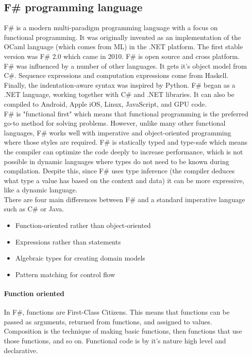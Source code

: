 \documentclass[12pt, a4paper]{article}
\begin{document}
\subsection{F\# programming language}
F\# is a modern multi-paradigm programming language with a focus on functional programming. It was originally invented as an implementation of the OCaml language (which comes from ML) in the .NET platform. The first stable version was F\# 2.0 which came in 2010. F\# is open source and cross platform. F\# was influenced by a number of other languages. It gets it’s object model from C\#. Sequence expressions and computation expressions come from Haskell. Finally, the indentation-aware syntax was inspired by Python. F\# began as a .NET language, working together with C\# and .NET libraries. It can also be compiled to Android, Apple iOS, Linux, JavaScript, and GPU code.\\

F\# is "functional first" which means that functional programming is the preferred go-to method for solving problems. However, unlike many other functional languages, F\# works well with imperative and object-oriented programming where those styles are required. F\# is statically typed and type-safe which means the compiler can optimize the code deeply to increase performance, which is not possible in dynamic languages where types do not need to be known during compilation. Despite this, since F\# uses type inference (the compiler deduces what type a value has based on the context and data) it can be more expressive, like a dynamic language.\\

There are four main differences between F\# and a standard imperative language such as C\# or Java.
\begin{itemize}
\item Function-oriented rather than object-oriented
\item Expressions rather than statements
\item Algebraic types for creating domain models
\item Pattern matching for control flow
\end{itemize}

\paragraph{Function oriented}
In F\#, functions are First-Class Citizens. This means that functions can be passed as arguments, returned from functions, and assigned to values. Composition is the technique of making basic functions, then functions that use those functions, and so on. Functional code is by it’s nature high level and declarative.
\end{document}
